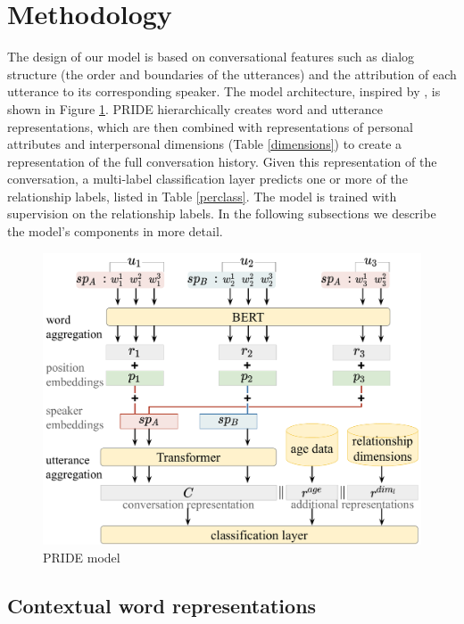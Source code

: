 \section{Methodology}

The design of our model is based on conversational features such as dialog structure (the order and boundaries of the utterances) and the attribution of each utterance to its corresponding speaker. The model architecture, inspired by \citet{li2020hierarchical}, is shown in Figure \ref{pipeline}. 
PRIDE hierarchically creates word and utterance representations, which are then combined with representations of personal attributes and interpersonal dimensions (Table \ref{dimensions}) to create a representation of the full conversation history.
Given this representation of the conversation, a multi-label classification layer predicts one or more of the relationship labels, listed in Table \ref{perclass}.
The model is trained with supervision on the relationship labels.
In the following subsections we describe the model's components in more detail.

\begin{figure}[t!]
\centering
\begin{adjustbox}{width=0.6\textwidth}
\includegraphics{imgs/PRIDE_scheme_3}
\end{adjustbox}
\caption{PRIDE model}
\label{pipeline}
\end{figure}

\subsection{Contextual word representations}

